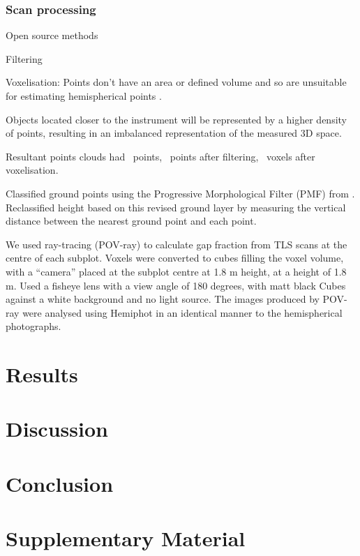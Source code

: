 \documentclass[11pt,a4paper]{article}
\newcommand{\beginsupplement}{%
	\setcounter{table}{0}
	\renewcommand{\thetable}{S\arabic{table}}%
	\setcounter{figure}{0}
	\renewcommand{\thefigure}{S\arabic{figure}}%
}
\begin{document}
\subsubsection{Scan processing}

Open source methods

Filtering

Voxelisation: Points don't have an area or defined volume and so are unsuitable for estimating hemispherical points \citep{Seidel2012}.

Objects located closer to the instrument will be represented by a higher density of points, resulting in an imbalanced representation of the measured 3D space.

Resultant points clouds had ~points, ~points after filtering, ~voxels after voxelisation.

Classified ground points using the Progressive Morphological Filter (PMF) from \citep{Zhang2003}. Reclassified height based on this revised ground layer by measuring the vertical distance between the nearest ground point and each point.

We used ray-tracing (POV-ray) to calculate gap fraction from TLS scans at the centre of each subplot. Voxels were converted to cubes filling the voxel volume, with a ``camera'' placed at the subplot centre at 1.8 m height, at a height of 1.8 m. Used a fisheye lens with a view angle of 180 degrees, with matt black Cubes against a white background and no light source. The images produced by POV-ray were analysed using Hemiphot in an identical manner to the hemispherical photographs.

\section{Results}

\section{Discussion}

\section{Conclusion}

\printbibliography

\section{Supplementary Material} \beginsupplement
\end{document}
